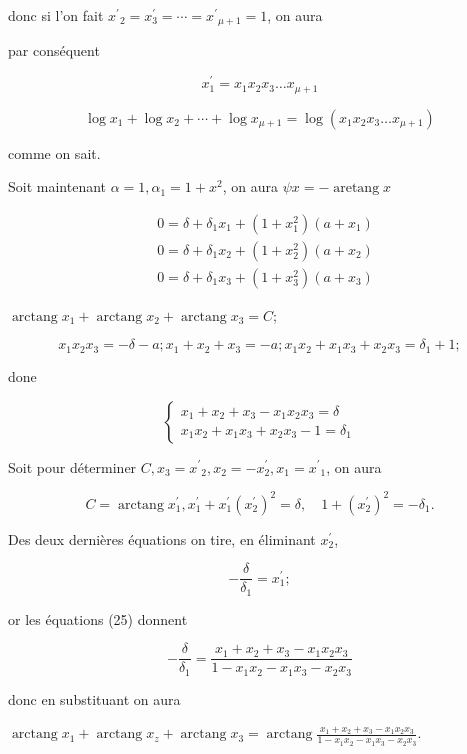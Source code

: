\documentclass{article}
\begin{document}
donc si l'on fait \(x^{\prime}{ }_{2}=x_{3}^{\prime}=\cdots=x^{\prime}{ }_{\mu+1}=1\), on aura

par conséquent

\[
x_{1}^{\prime}=x_{1} x_{2} x_{3} \ldots x_{\mu+1}
\]

\[
\log x_{1}+\log x_{2}+\cdots+\log x_{\mu+1}=\log \left(x_{1} x_{2} x_{3} \ldots x_{\mu+1}\right)
\]

comme on sait.

Soit maintenant \(\alpha=1, \alpha_{1}=1+x^{2}\), on aura \(\psi x=-\operatorname{aretang} x\)

\[
\begin{aligned}
& 0=\delta+\delta_{1} x_{1}+\left(1+x_{1}^{2}\right)\left(a+x_{1}\right) \\
& 0=\delta+\delta_{1} x_{2}+\left(1+x_{2}^{2}\right)\left(a+x_{2}\right) \\
& 0=\delta+\delta_{1} x_{3}+\left(1+x_{3}^{2}\right)\left(a+x_{3}\right)
\end{aligned}
\]

\(\operatorname{arctang} x_{1}+\operatorname{arctang} x_{2}+\operatorname{arctang} x_{3}=C\);

\[
x_{1} x_{2} x_{3}=-\delta-a ; x_{1}+x_{2}+x_{3}=-a ; x_{1} x_{2}+x_{1} x_{3}+x_{2} x_{3}=\delta_{1}+1 ;
\]

done

\[
\left\{\begin{array}{l}
x_{1}+x_{2}+x_{3}-x_{1} x_{2} x_{3}=\delta \\
x_{1} x_{2}+x_{1} x_{3}+x_{2} x_{3}-1=\delta_{1}
\end{array}\right.
\]

Soit pour déterminer \(C, x_{3}=x^{\prime}{ }_{2}, x_{2}=-x_{2}^{\prime}, x_{1}=x^{\prime}{ }_{1}\), on aura

\[
C=\operatorname{arctang} x_{1}^{\prime}, x_{1}^{\prime}+x_{1}^{\prime}\left(x_{2}^{\prime}\right)^{2}=\delta, \quad 1+\left(x_{2}^{\prime}\right)^{2}=-\delta_{1} .
\]

Des deux dernières équations on tire, en éliminant \(x_{2}^{\prime}\),

\[
-\frac{\delta}{\delta_{1}}=x_{1}^{\prime} ;
\]

or les équations (25) donnent

\[
-\frac{\delta}{\delta_{1}}=\frac{x_{1}+x_{2}+x_{3}-x_{1} x_{2} x_{3}}{1-x_{1} x_{2}-x_{1} x_{3}-x_{2} x_{3}}
\]

donc en substituant on aura

\(\operatorname{arctang} x_{1}+\operatorname{arctang} x_{z}+\operatorname{arctang} x_{3}=\operatorname{arctang} \frac{x_{1}+x_{2}+x_{3}-x_{1} x_{2} x_{3}}{1-x_{1} x_{2}-x_{1} x_{3}-x_{2} x_{3}}\).
\end{document}
